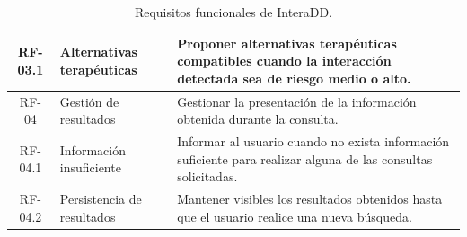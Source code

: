 \begin{table}[ht]
\begin{tabularx}{\textwidth}{c p{4.5cm} X}
RF-03.1 & Alternativas terapéuticas &
Proponer alternativas terapéuticas compatibles cuando la interacción detectada sea de riesgo medio o alto. \\

\midrule

RF-04 & Gestión de resultados &
Gestionar la presentación de la información obtenida durante la consulta. \\

RF-04.1 & Información insuficiente &
Informar al usuario cuando no exista información suficiente para realizar alguna de las consultas solicitadas. \\

RF-04.2 & Persistencia de resultados &
Mantener visibles los resultados obtenidos hasta que el usuario realice una nueva búsqueda. \\

\bottomrule
\end{tabularx}
\caption{Requisitos funcionales de InteraDD.}
\label{tab:funcionales}
\end{table}

